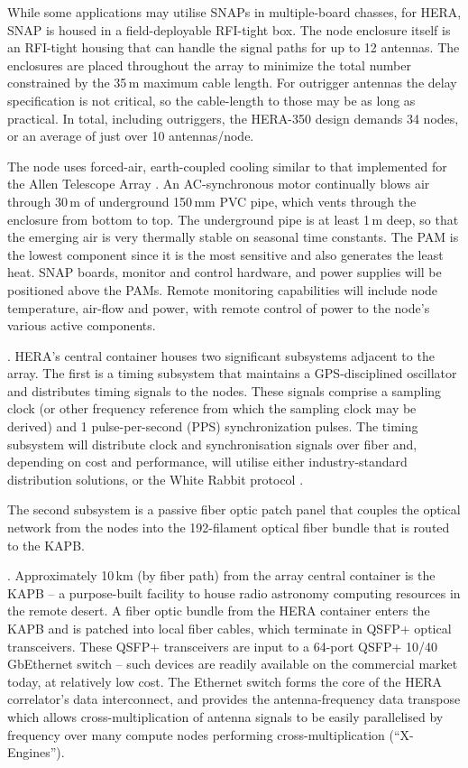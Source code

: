\documentclass[preprint,11pt]{aastex}
\newcommand{\Mycitep}[1]{\citep{#1}}
\begin{document}
While some applications may utilise SNAPs in multiple-board chasses, for HERA, SNAP is housed in a field-deployable RFI-tight box.
The node enclosure itself is an RFI-tight housing that can handle the signal paths for up to 12 antennas.
The enclosures are placed throughout the array to minimize the total number constrained by the 35\,m maximum cable length. 
For outrigger antennas the delay specification is not critical, so the cable-length to those may be as long as practical.
In total, including outriggers, the HERA-350 design demands 34 nodes, or an average of just over 10 antennas/node.

The node uses forced-air, earth-coupled cooling similar to that implemented for the Allen Telescope Array \citep{2009IEEEP..97.1438W}.
An AC-synchronous motor continually blows air through 30\,m of underground 150\,mm PVC pipe, which vents through the enclosure from bottom to top.
The underground pipe is at least 1\,m deep, so that the emerging air is very thermally stable on seasonal time constants.
The PAM is the lowest component since it is the most sensitive and also generates the least heat.
SNAP boards, monitor and control hardware, and power supplies will be positioned above the PAMs.
Remote monitoring capabilities will include node temperature, air-flow and power, with remote control of power to the node's various active components.

\vspace{.2in}
.
HERA's central container houses two significant subsystems adjacent to the array.
The first is a timing subsystem that maintains a GPS-disciplined oscillator and distributes timing signals to the nodes.
These signals comprise a sampling clock (or other frequency reference from which the sampling clock may be derived) and 1 pulse-per-second (PPS) synchronization pulses.
The timing subsystem will distribute clock and synchronisation signals over fiber and, depending on cost and performance, will utilise either industry-standard distribution solutions, or the White Rabbit protocol \Mycitep{Moreira_WR}.

The second subsystem is a passive fiber optic patch panel that couples the optical network from the nodes into the 192-filament optical fiber bundle that is routed to the KAPB.

\vspace{.2in}
.
Approximately 10\,km (by fiber path) from the array central container is the KAPB -- a purpose-built facility to house radio astronomy computing resources in the remote desert.
A fiber optic bundle from the HERA container enters the KAPB and is patched into local fiber cables, which terminate in QSFP+ optical transceivers.
These QSFP+ transceivers are input to a 64-port QSFP+ 10/40 GbEthernet switch -- such devices are readily available on the commercial market today, at relatively low cost.
The Ethernet switch forms the core of the HERA correlator's data interconnect, and provides the antenna-frequency data transpose which allows cross-multiplication of antenna signals to be easily parallelised by frequency over many compute nodes performing cross-multiplication (``X-Engines'').
\end{document}
